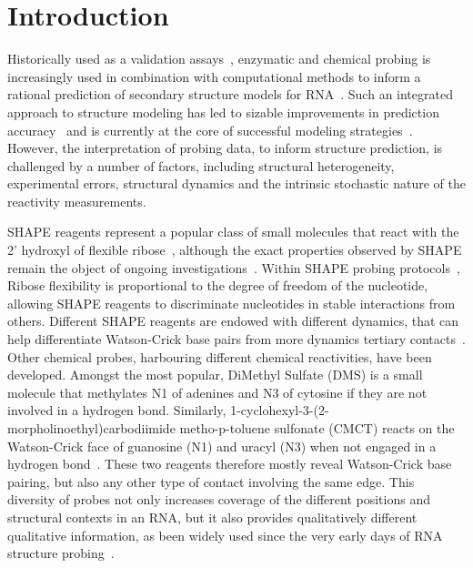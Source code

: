 \documentclass[a4,center,fleqn]{NAR}
\begin{document}


\section*{Introduction}


Historically used as a validation assays~\cite{Knapp1989}, enzymatic and chemical probing  is increasingly used in combination with computational methods to inform a rational prediction of secondary structure models for RNA~\cite{Mathews2004}. Such an integrated approach to structure modeling has led to sizable improvements in prediction accuracy~\cite{Washietl2012} and is currently at the core of successful modeling strategies~\cite{Miao2017}. However, the interpretation of probing data, to inform structure prediction, is challenged by a number of factors, including structural heterogeneity, experimental errors, structural dynamics and the intrinsic stochastic nature of the reactivity measurements. 

SHAPE reagents represent a popular class of small molecules that react with the 2’ hydroxyl of flexible ribose~\cite{McGinnis2012}, although the exact properties observed by SHAPE remain the object of ongoing investigations~\cite{Hurst2018,Mlynsky2018,Frezza2019}. 
Within SHAPE probing protocols~\cite{Wilkinson2006,Lucks2011,Smola2015}, Ribose flexibility is proportional to the degree of freedom of the nucleotide, allowing SHAPE reagents to discriminate nucleotides in stable interactions from others. Different SHAPE reagents are endowed with different dynamics, that can help differentiate Watson-Crick base pairs from more dynamics tertiary contacts~\cite{Gherghe2008,Steen2012}. Other chemical probes, harbouring different chemical reactivities, have been developed. Amongst the most popular, DiMethyl Sulfate (DMS) is a small molecule that methylates N1 of adenines and N3 of cytosine if they are not involved in a hydrogen bond. Similarly, 1-cyclohexyl-3-(2-morpholinoethyl)carbodiimide metho-p-toluene sulfonate (CMCT) reacts on the Watson-Crick face of guanosine (N1) and uracyl (N3) when not engaged in a hydrogen bond~\cite{Ehresmann1987,Brunel2000}. These two reagents therefore mostly reveal Watson-Crick base pairing, but also any other type of contact involving the same edge. This diversity of probes not only increases  coverage of the different positions and structural contexts in an RNA, but it also provides qualitatively different qualitative information, as been widely used since the very early days of RNA structure probing~\cite{Moazed1986, Romaniuk1988, Butcher1994, Brunel2000,  Cordero2015, Somarowthu2015, Gross2017}. 
\end{document}
